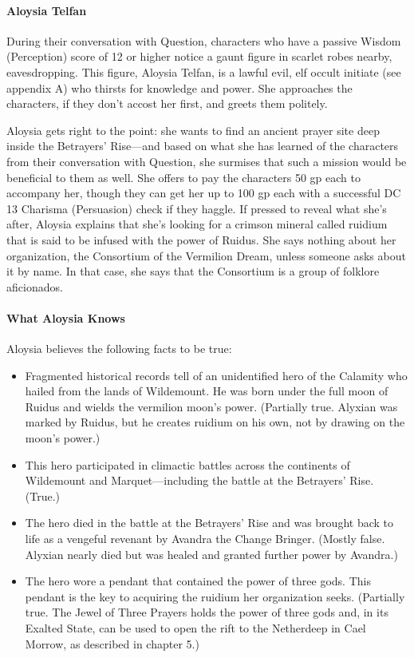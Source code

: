 \documentclass[10pt,a4paper,twoside,bg=print,twocolumn,openany,nodeprecatedcode]{dndbook}
\begin{document}
\paragraph{Aloysia Telfan}
During their conversation with Question, characters who have a passive Wisdom (Perception) score of 12 or higher notice a gaunt figure in scarlet robes nearby, eavesdropping. This figure, Aloysia Telfan, is a lawful evil, elf occult initiate (see appendix A) who thirsts for knowledge and power. She approaches the characters, if they don't accost her first, and greets them politely.

Aloysia gets right to the point: she wants to find an ancient prayer site deep inside the Betrayers' Rise—and based on what she has learned of the characters from their conversation with Question, she surmises that such a mission would be beneficial to them as well. She offers to pay the characters 50 gp each to accompany her, though they can get her up to 100 gp each with a successful DC 13 Charisma (Persuasion) check if they haggle. If pressed to reveal what she's after, Aloysia explains that she's looking for a crimson mineral called ruidium that is said to be infused with the power of Ruidus. She says nothing about her organization, the Consortium of the Vermilion Dream, unless someone asks about it by name. In that case, she says that the Consortium is a group of folklore aficionados.

\paragraph{What Aloysia Knows}
Aloysia believes the following facts to be true:


\begin{itemize}
\item Fragmented historical records tell of an unidentified hero of the Calamity who hailed from the lands of Wildemount. He was born under the full moon of Ruidus and wields the vermilion moon's power. (Partially true. Alyxian was marked by Ruidus, but he creates ruidium on his own, not by drawing on the moon's power.)
\item This hero participated in climactic battles across the continents of Wildemount and Marquet—including the battle at the Betrayers' Rise. (True.)
\item The hero died in the battle at the Betrayers' Rise and was brought back to life as a vengeful revenant by Avandra the Change Bringer. (Mostly false. Alyxian nearly died but was healed and granted further power by Avandra.)
\item The hero wore a pendant that contained the power of three gods. This pendant is the key to acquiring the ruidium her organization seeks. (Partially true. The Jewel of Three Prayers holds the power of three gods and, in its Exalted State, can be used to open the rift to the Netherdeep in Cael Morrow, as described in chapter 5.)
\end{itemize}
\end{document}
